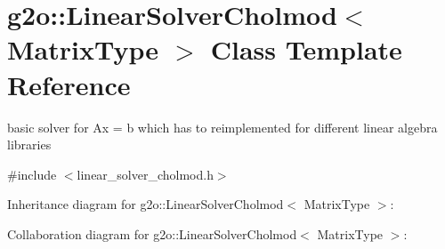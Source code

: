 \hypertarget{classg2o_1_1LinearSolverCholmod}{}\section{g2o\+:\+:Linear\+Solver\+Cholmod$<$ Matrix\+Type $>$ Class Template Reference}
\label{classg2o_1_1LinearSolverCholmod}


basic solver for Ax = b which has to reimplemented for different linear algebra libraries  




{\ttfamily \#include $<$linear\+\_\+solver\+\_\+cholmod.\+h$>$}



Inheritance diagram for g2o\+:\+:Linear\+Solver\+Cholmod$<$ Matrix\+Type $>$\+:


Collaboration diagram for g2o\+:\+:Linear\+Solver\+Cholmod$<$ Matrix\+Type $>$\+:
